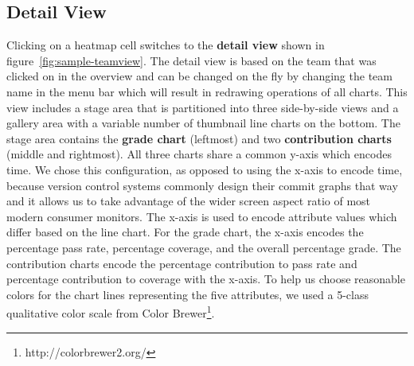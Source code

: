 \documentclass[../manifest.tex]{subfiles}
\begin{document}
\subsection{Detail View}

Clicking on a heatmap cell switches to the \textbf{detail view} shown in figure~\ref{fig:sample-teamview}. The detail view is based on the team that was clicked on in the overview and can be changed on the fly by changing the team name in the menu bar which will result in redrawing operations of all charts. This view includes a stage area that is partitioned into three side-by-side views and a gallery area with a variable number of thumbnail line charts on the bottom. The stage area contains the \textbf{grade chart} (leftmost) and two \textbf{contribution charts} (middle and rightmost). All three charts share a common y-axis which encodes time. We chose this configuration, as opposed to using the x-axis to encode time, because version control systems commonly design their commit graphs that way and it allows us to take advantage of the wider screen aspect ratio of most modern consumer monitors. The x-axis is used to encode attribute values which differ based on the line chart. For the grade chart, the x-axis encodes the percentage pass rate, percentage coverage, and the overall percentage grade. The contribution charts encode the percentage contribution to pass rate and percentage contribution to coverage with the x-axis. To help us choose reasonable colors for the chart lines representing the five attributes, we used a 5-class qualitative color scale from Color Brewer\footnote{http://colorbrewer2.org/}.



\end{document}
